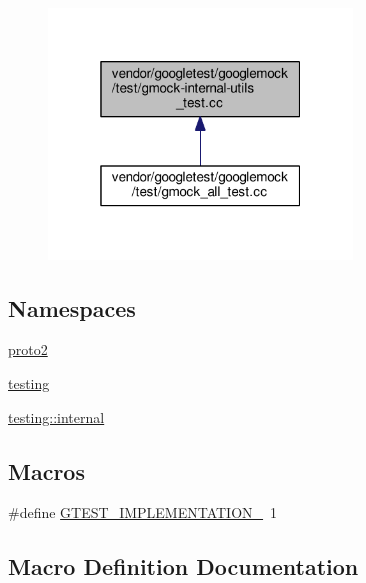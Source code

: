 \begin{figure}[H]
\begin{center}
\leavevmode
\includegraphics[width=229pt]{gmock-internal-utils__test_8cc__dep__incl}
\end{center}
\end{figure}
\subsection*{Namespaces}
\begin{DoxyCompactItemize}
\item 
 \hyperlink{namespaceproto2}{proto2}
\item 
 \hyperlink{namespacetesting}{testing}
\item 
 \hyperlink{namespacetesting_1_1internal}{testing\+::internal}
\end{DoxyCompactItemize}
\subsection*{Macros}
\begin{DoxyCompactItemize}
\item 
\#define \hyperlink{gmock-internal-utils__test_8cc_a83bd232fd1077579fada92c31bb7469f}{G\+T\+E\+S\+T\+\_\+\+I\+M\+P\+L\+E\+M\+E\+N\+T\+A\+T\+I\+O\+N\+\_\+}~1
\end{DoxyCompactItemize}


\subsection{Macro Definition Documentation}
